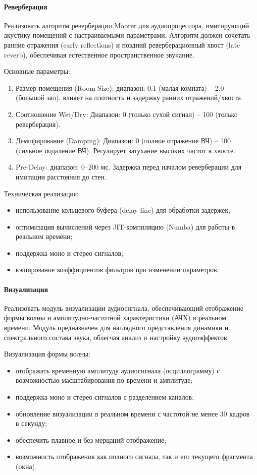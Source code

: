 \paragraph{Реверберация}

Реализовать алгоритм реверберации Moorer для аудиопроцессора, имитирующий акустику помещений с настраиваемыми параметрами. Алгоритм должен сочетать ранние отражения (early reflections) и поздний реверберационный хвост (late reverb), обеспечивая естественное пространственное звучание.

Основные параметры:
\begin{enumerate}
	\item Размер помещения (Room Size): диапазон: 0.1 (малая комната) – 2.0 (большой зал). влияет на плотность и задержку ранних отражений/хвоста.
	\item Соотношение Wet/Dry: Диапазон: 0 (только сухой сигнал) – 100 (только реверберация).
	\item Демпфирование (Damping): Диапазон: 0 (полное отражение ВЧ) – 100 (сильное подаление ВЧ). Регулирует затухание высоких частот в хвосте.
	\item Pre-Delay: диапазон: 0–200 мс. Задержка перед началом реверберации для имитации расстояния до стен.
\end{enumerate}

Техническая реализация:
\begin{itemize}
	\item использование кольцевого буфера (delay line) для обработки задержек;
	\item оптимизация вычислений через JIT-компиляцию (Numba) для работы в реальном времени;
	\item поддержка моно и стерео сигналов;
	\item кэширование коэффициентов фильтров при изменении параметров.
\end{itemize}

\paragraph{Визуализация}

Реализовать модуль визуализации аудиосигнала, обеспечивающий отображение формы волны и амплитудно-частотной характеристики (АЧХ) в реальном времени. Модуль предназначен для наглядного представления динамики и спектрального состава звука, облегчая анализ и настройку аудиоэффектов.

Визуализация формы волны:
\begin{itemize}
	\item отображать временную амплитуду аудиосигнала (осциллограмму) с возможностью масштабирования по времени и амплитуде;
	\item поддержка моно и стерео сигналов с разделением каналов;
	\item обновление визуализации в реальном времени с частотой не менее 30 кадров в секунду;
	\item обеспечить плавное и без мерцаний отображение;
	\item возможность отображения как полного сигнала, так и его текущего фрагмента (окна).
\end{itemize}

